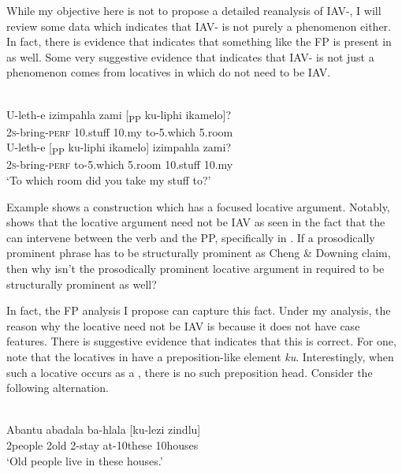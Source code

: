 \documentclass[output=paper,newtxmath,modfonts,nonflat,hidelinks]{langsci/langscibook}
\begin{document}
While my objective here is not to propose a detailed reanalysis of  IAV-, I will review some data which indicates that  IAV- is not purely a  phenomenon either. In fact, there is evidence that indicates that something like the FP is present in  as well. Some very suggestive evidence that indicates that  IAV- is not just a  phenomenon comes from locatives in  which do not need to be IAV. 

\ea\label{ex:selvanathan:15}
 \citep[168]{Buell2009}\\
\ea\label{ex:selvanathan:15a}
	\gll U-leth-e      izimpahla  zami   [\textsubscript{PP} ku-liphi      ikamelo]? \\
	2\textsc{s}{}-bring-\textsc{perf}  10.stuff   10.my   {}     to-5.which   5.room\\
	
\ex\label{ex:selvanathan:15b}
	\gll U-leth-e          [\textsubscript{PP} ku-liphi   ikamelo]   izimpahla  zami?\\
	2\textsc{s}{}-bring-\textsc{perf}   {}   to-5.which   5.room     10.stuff     10.my\\
	\glt `To which room did you take my stuff to?'
\z
\z

Example  shows a construction which has a focused locative argument. Notably,  shows that the locative argument need not be IAV as seen in the fact that the  can intervene between the verb and the PP, specifically in . If a prosodically prominent phrase has to be structurally prominent as Cheng \& Downing claim, then why isn't the prosodically prominent locative argument in  required to be structurally prominent as well? 

In fact, the FP analysis I propose can capture this fact. Under my analysis, the reason why the locative need not be IAV is because it does not have case features. There is suggestive evidence that indicates that this is correct. For one, note that the locatives in  have a preposition-like element \textit{ku}. Interestingly, when such a locative occurs as a , there is no such preposition head. Consider the following alternation.

\ea\label{ex:selvanathan:16}
 \citep[107]{Buell2007}\\
\ea\label{ex:selvanathan:16a}
\gll Abantu  abadala  ba-hlala  [ku-lezi   zindlu] \\
2people   2old     2-stay   at-10these   10houses\\
\glt `Old people live in these houses.' 
\end{document}
